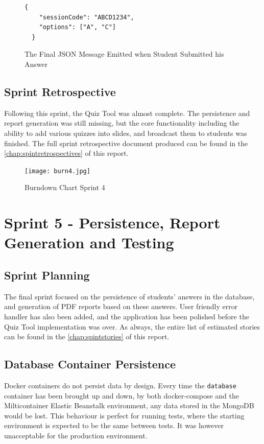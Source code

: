 \begin{figure}[h!]
  \begin{lstlisting}[basicstyle=\small]
  {
    "sessionCode": "ABCD1234",
    "options": ["A", "C"]
  }
  \end{lstlisting}
  \caption{The Final JSON Message Emitted when Student Submitted his Answer}
\end{figure}

\subsection{Sprint Retrospective}
Following this sprint, the Quiz Tool was almost complete. The persistence and report
generation was still missing, but the core functionality including the ability
to add various quizzes into slides, and broadcast them to students was finished.
The full sprint retrospective document produced can be found in the
\autoref{chap:spintretrospectives} of this report.

\begin{figure}[h!]
    \centering
    \texttt{[image: burn4.jpg]}
    \caption{Burndown Chart Sprint 4}
    \label{fig:burn4}
\end{figure}

\section{Sprint 5 - Persistence, Report Generation and Testing}
\subsection{Sprint Planning}
The final sprint focused on the persistence of students' answers in the database, and
generation of PDF reports based on these answers. User friendly error handler has
also been added, and the application has been polished before the Quiz Tool implementation
was over. As always, the entire list of estimated stories
can be found in the \autoref{chap:spintstories} of this report.

\subsection{Database Container Persistence}
Docker containers do not persist data by design. Every time the \texttt{database}
container has been brought up and down, by both docker-compose and the
Milticontainer Elastic Beanstalk environment, any data stored in the MongoDB
would be lost. This behaviour is perfect for running tests, where the starting
environment is expected to be the same between tests. It was however unacceptable
for the production environment.


